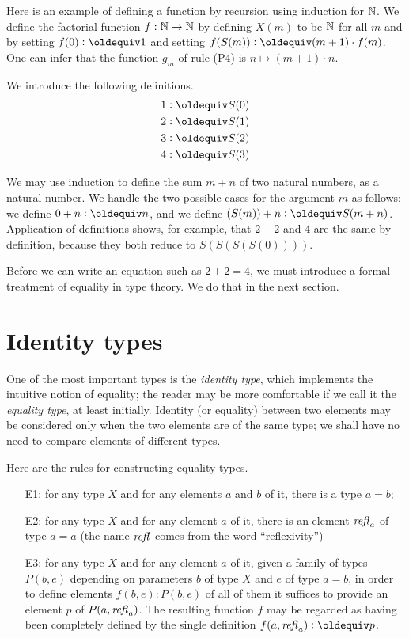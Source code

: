 Here is an example of defining a function by recursion using induction for $\mathbb{N}$.  We define the factorial function $f : \mathbb{N} \to \mathbb{N}$ by
defining $X(m)$ to be $\mathbb{N}$ for all $m$ and by setting $f(0) \defeq 1$ and setting $f(S(m)) \defeq (m+1) \cdot f(m)$.  One can infer that the
function $g_m$ of rule (P4) is $n \mapsto (m+1) \cdot n$.

We introduce the following definitions.
\begin{align*}
 1 & \defeq S(0) \\
 2 & \defeq S(1) \\
 3 & \defeq S(2) \\
 4 & \defeq S(3)
\end{align*}

We may use induction to define the sum $m+n$ of two natural numbers, as a natural number.  We handle the two possible cases for the argument $m$
as follows: we define $0+n \defeq n$, and we define $(S(m))+n \defeq S(m+n)$.  Application of definitions shows, for example, that $2+2$ and $4$
are the same by definition, because they both reduce to $S(S(S(S(0))))$.

Before we can write an equation such as $2+2=4$, we must introduce a formal treatment of equality in type theory.  We do that in the next section.

\section{Identity types}
\label{sec:identity-types}

One of the most important types is the \emph{identity type}, which implements the intuitive notion of equality; the reader may be more
comfortable if we call it the \emph{equality type}, at least initially.  Identity (or equality) between two elements may be considered only when
the two elements are of the same type; we shall have no need to compare elements of different types.

Here are the rules for constructing equality types.
\begin{enumerate}
\item[E1:]
  for any type $X$ and for any elements $a$ and $b$ of it, there is a type $a=b$;
\item[E2:] for any type $X$ and for any element $a$ of it, there is an element $\mathop{{\it refl}_{a}}$ of type $a=a$ (the name $\mathop{{\it refl}_{}}$ comes from the word
  ``reflexivity'')
\item[E3:] for any type $X$ and for any element $a$ of it, given a family of types $P(b,e)$ depending on parameters $b$ of type $X$ and $e$ of type
  $a=b$, in order to define elements $f(b,e) : P(b,e)$ of all of them it suffices to provide an element $p$ of $P(a,\mathop{{\it refl}_{a}})$.  The resulting
  function $f$ may be regarded as having been completely defined by the single definition $f(a,\refl a) \defeq p$.
\end{enumerate}

